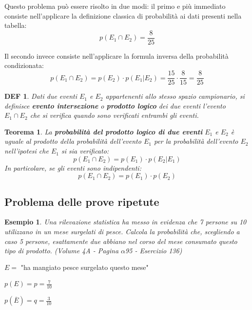 \documentclass{article}     %
\newtheorem*{theorem}{Teorema}
\newtheorem*{definition}{DEF}
\newtheorem{ex}{Esempio}[section]
\begin{document}
                Questo problema può essere risolto in due modi: il primo e più immediato consiste nell'applicare la definizione classica di probabilità ai dati presenti nella tabella:
                \[p(E_1\cap E_2)=\frac{8}{25}\]

                Il secondo invece consiste nell'applicare la formula inversa della probabilità condizionata:
                \[p(E_1\cap E_2)=p(E_2)\cdot p(E_1|E_2)=\frac{15}{25}\cdot\frac{8}{15}=\frac{8}{25}\]

                \begin{definition}
                    Dati due eventi $E_1$ e $E_2$ appartenenti allo stesso spazio campionario, si definisce \textbf{evento intersezione} o \textbf{prodotto logico} dei due eventi l'evento $E_1 \cap E_2$ che si verifica quando sono verificati entrambi gli eventi.
                \end{definition}

                \begin{theorem}
                    La \textbf{probabilità del prodotto logico di due eventi} $E_1$ e $E_2$ è uguale al prodotto della probabilità dell'evento $E_1$ per la probabilità dell'evento $E_2$ nell'ipotesi che $E_1$ si sia verificato:
                    \[p(E_1\cap E_2)=p(E_1)\cdot p(E_2|E_1)\]
                    In particolare, se gli eventi sono \textit{indipendenti}:
                    \[p(E_1\cap E_2)=p(E_1)\cdot p(E_2)\]
                \end{theorem}

            \subsection{Problema delle prove ripetute}
                \begin{ex}
                    Una rilevazione statistica ha messo in evidenza che 7 persone su 10 utilizzano in un mese surgelati di pesce. Calcola la probabilità che, scegliendo a caso 5 persone, esattamente due abbiano nel corso del mese consumato questo tipo di prodotto. (Volume 4A - Pagina $\alpha$95 - Esercizio 136)
                \end{ex}

                $E=$ "ha mangiato pesce surgelato questo mese"

                $p(E)=p=\frac{7}{10}$

                $p(\overline{E})=q=\frac{3}{10}$
\end{document}
